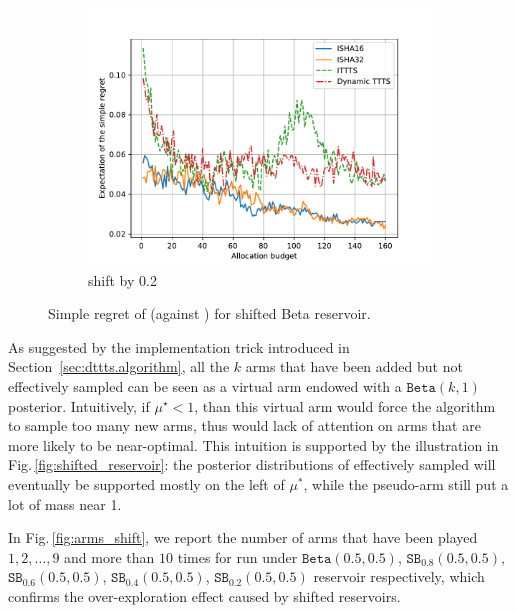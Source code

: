 \begin{figure}[ht]
\begin{subfigure}[ht]{0.33\textwidth}
    \centering\includegraphics[width=\textwidth]{Chapter6/img/shift/shift_-2.pdf}
    \caption{shift by 0.2}
  \end{subfigure}%
  \caption{Simple regret of \DTTTS (against \Hyperband) for shifted Beta reservoir.}
  \label{fig:shift}
\end{figure}

As suggested by the implementation trick introduced in Section~\ref{sec:dttts.algorithm}, all the $k$ arms that have been added but not effectively sampled can be seen as a virtual arm endowed with a $\texttt{Beta}(k,1)$ posterior. Intuitively, if $\mu^\star < 1$, than this virtual arm would force the algorithm to sample too many new arms, thus would lack of attention on arms that are more likely to be near-optimal. This intuition is supported by the illustration in Fig.\,\ref{fig:shifted_reservoir}: the posterior distributions of effectively sampled will eventually be supported mostly on the left of $\mu^*$, while the pseudo-arm still put a lot of mass near 1. 

In Fig.\,\ref{fig:arms_shift}, we report the number of arms that have been played $1,2,\dots,9$ and more than $10$ times for \DTTTS run under $\texttt{Beta}(0.5,0.5)$, $\texttt{SB}_{0.8}(0.5,0.5)$, $\texttt{SB}_{0.6}(0.5,0.5)$, $\texttt{SB}_{0.4}(0.5,0.5)$, $\texttt{SB}_{0.2}(0.5,0.5)$ reservoir respectively, which confirms the over-exploration effect caused by shifted reservoirs.

